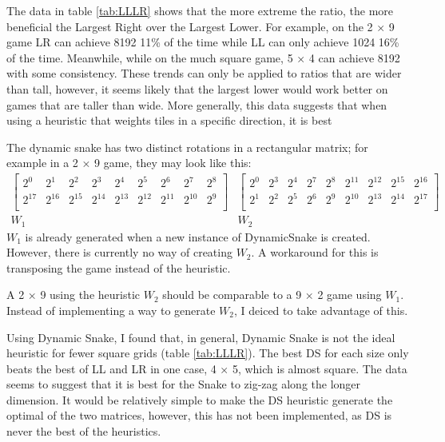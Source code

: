 \documentclass{article}
\begin{document}
The data in table \ref{tab:LLLR} shows that the more extreme the ratio, the more beneficial the Largest Right  over the Largest Lower. For example, on the 2 × 9 game LR can achieve 8192 11\% of the time while LL can only achieve 1024 16\% of the time. Meanwhile, while on the much square game, 5 × 4 can achieve 8192 with some consistency. These trends can only be applied to ratios that are wider than tall, however, it seems likely that the largest lower would work better on games that are taller than wide. More generally, this data suggests that when using a heuristic that weights tiles in a specific direction, it is best 

The dynamic snake has two distinct rotations in a rectangular matrix; for example in a 2 × 9 game, they may look like this:
$$
\begin{matrix}
    \begin{bmatrix}
        2^0 & 2^1 & 2^2 & 2^3 & 2^4 & 2^5 & 2^6 & 2^7 & 2^8 \\
        2^{17} & 2^{16} & 2^{15} & 2^{14} & 2^{13} & 2^{12} & 2^{11} & 2^{10} & 2^9 \\
    \end{bmatrix}  &
    \begin{bmatrix}
        2^0 & 2^3 & 2^4 & 2^7 & 2^8 & 2^{11} & 2^{12} & 2^{15} & 2^{16} \\
        2^1 & 2^2 & 2^5 & 2^6 & 2^9 & 2^{10} & 2^{13} & 2^{14} & 2^{17} \\
    \end{bmatrix} \\
    W_1 & W_2
\end{matrix}
$$
$W_1$ is already generated when a new instance of DynamicSnake is created. However, there is currently no way of creating $W_2$. A workaround for this is transposing the game instead of the heuristic.

A 2 × 9 using the heuristic $W_2$ should be comparable to a 9 × 2 game using $W_1$. Instead of implementing a way to generate $W_2$, I deiced to take advantage of this.

Using Dynamic Snake, I found that, in general, Dynamic Snake is not the ideal heuristic for fewer square grids (table \ref{tab:LLLR}). The best DS for each size only beats the best of LL and LR in one case, 4 × 5, which is almost square. The data seems to suggest that it is best for the Snake to zig-zag along the longer dimension.  It would be relatively simple to make the DS heuristic generate the optimal of the two matrices, however, this has not been implemented, as DS is never the best of the heuristics.
\end{document}
